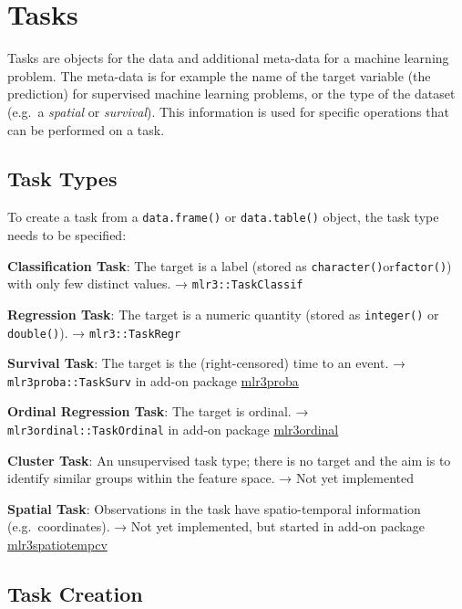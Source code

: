 \documentclass[
  11pt,
  parskip=half,
  DIV=calc,
  BCOR=10mm,
  x11names]{scrbook}
\begin{document}
\hypertarget{tasks}{%
\section{Tasks}\label{tasks}}

Tasks are objects for the data and additional meta-data for a machine learning problem.
The meta-data is for example the name of the target variable (the prediction) for supervised machine learning problems, or the type of the dataset (e.g.~a \emph{spatial} or \emph{survival}).
This information is used for specific operations that can be performed on a task.

\hypertarget{tasks-types}{%
\subsection{Task Types}\label{tasks-types}}

To create a task from a \texttt{data.frame()} or \texttt{data.table()} object, the task type needs to be specified:

\textbf{Classification Task}: The target is a label (stored as \texttt{character()}or\texttt{factor()}) with only few distinct values.
→ \texttt{mlr3::TaskClassif}

\textbf{Regression Task}: The target is a numeric quantity (stored as \texttt{integer()} or \texttt{double()}).
→ \texttt{mlr3::TaskRegr}

\textbf{Survival Task}: The target is the (right-censored) time to an event.
→ \texttt{mlr3proba::TaskSurv} in add-on package \href{https://mlr3proba.mlr-org.com}{mlr3proba}

\textbf{Ordinal Regression Task}: The target is ordinal.
→ \texttt{mlr3ordinal::TaskOrdinal} in add-on package \href{https://mlr3ordinal.mlr-org.com}{mlr3ordinal}

\textbf{Cluster Task}: An unsupervised task type; there is no target and the aim is to identify similar groups within the feature space.
→ Not yet implemented

\textbf{Spatial Task}: Observations in the task have spatio-temporal information (e.g.~coordinates).
→ Not yet implemented, but started in add-on package \href{https://mlr3spatiotempcv.mlr-org.com}{mlr3spatiotempcv}

\hypertarget{tasks-creation}{%
\subsection{Task Creation}\label{tasks-creation}}
\end{document}
